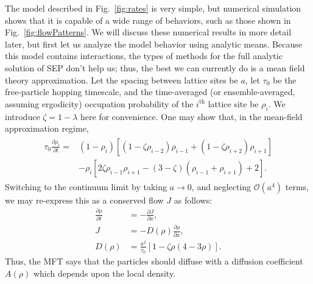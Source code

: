 \documentclass[
reprint,
 amsmath,amssymb,
 aps,
 prl,
]{revtex4-1}
\newcommand{\partDeriv}[2]{\frac{\partial #1}{\partial #2}}
\begin{document}
The model described in Fig.~\ref{fig:rates} is very simple, but numerical simulation shows that it is capable of a wide range of behaviors, such as those shown in Fig.~\ref{fig:flowPatterns}. We will discuss
these numerical results in more detail later, but first let us analyze the model behavior using analytic means.
Because this model contains interactions, the types of methods for the full analytic solution of SEP don't help us; thus, the best we can currently do is a mean field theory approximation.
Let the spacing between lattice sites be $a$, let $\tau_0$ be the free-particle hopping timescale, and the time-averaged (or ensemble-averaged, assuming ergodicity) occupation probability of the $i^{\mathrm{th}}$ lattice site be $\rho_i$.
We introduce $\zeta = 1 - \lambda $ here for convenience.
One may show that, in the mean-field approximation regime,
\begin{align}
\begin{split}
 \tau_0 \partDeriv{\rho_i}{t} = &\left( 1-\rho_i \right) \left[ \left(1-\zeta\rho_{i-2} \right) \rho_{i-1} + \left(1-\zeta\rho_{i+2} \right) \rho_{i+1} \right] \\
 &- \rho_i \left[ 2 \zeta \rho_{i-1} \rho_{i+1}  - (3-\zeta)\left(\rho_{i-1} + \rho_{i+1}\right) + 2 \right].
 \end{split}
 \end{align}
Switching to the continuum limit by taking $a\rightarrow 0$, and neglecting $\mathcal{O}(a^4)$ terms, we may re-express this as a conserved flow $J$ as follows:
\begin{align}
 \partDeriv{\rho}{t} &= - \partDeriv{J}{x}, \\
 J &= -  D(\rho) \partDeriv{\rho}{x}, \\
 D(\rho) &= \frac{a^2}{\tau_0} \left[1 - \zeta \rho\left(4-3\rho\right) \right]. 
\end{align}
Thus, the MFT says that the particles should diffuse with a diffusion coefficient $A(\rho)$ which depends upon the local density.
\end{document}
